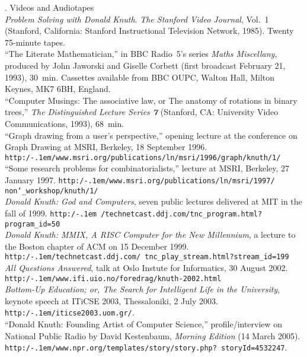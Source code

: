 \vskip 20pt
. {Videos and Audiotapes}
\\{\sl Problem Solving with Donald Knuth}. {\sl The Stanford Video Journal},
 Vol.~1 (Stanford, California: Stanford Instructional Television Network,
 1985). Twenty 75-minute tapes.
\\``The Literate Mathematician,'' in BBC Radio~5's series {\sl Maths
 Miscellany}, produced by John Jaworski and Giselle Corbett
 (first broadcast February 21, 1993), 30~min. Cassettes available from
 BBC OUPC, Walton Hall, Milton Keynes, MK7 6BH, England.
\\``Computer Musings: The associative law, or The anatomy of
 rotations in binary trees,'' {\sl The Distinguished Lecture Series\/ \bf7}
 (Stanford, CA: University Video Communications, 1993), 68~min.
\\``Graph drawing from a user's perspective,'' opening lecture at the
 conference on Graph Drawing at MSRI, Berkeley, 18 September 1996.
 {\tt http:/\kern-.1em/www.msri.org/publications/ln/msri/1996/graph/knuth/1/}
\\``Some research problems for combinatorialists,'' lecture
 at MSRI, Berkeley, 27 January 1997.
 {\tt http:/\kern-.1em/www.\allowbreak msri.org/publications/ln/msri/1997/%
 non\char`\_workshop/knuth/1/}
\\{\sl Donald Knuth: God and Computers}, seven public lectures delivered at MIT
 in the fall of 1999. {\tt http:/\kern-.1em
 /\allowbreak technetcast.ddj.com/tnc\_program.html?program\_id=50}
\\{\sl Donald Knuth: MMIX, A RISC Computer for the New Millennium}, a
 lecture to the Boston chapter of ACM on 15 December 1999.
 {\tt http:/\kern-.1em/technetcast.ddj.com/\allowbreak
 tnc\_play\_stream.html?stream\_id=199}
\\{\sl All Questions Answered}, talk at Oslo Instute for Informatics,
 30 August 2002.
 {\tt http:/\kern-.1em/www.ifi.uio.no/\allowbreak foredrag/knuth-2002.html}
\\{\sl Bottom-Up Education; or, The Search for Intelligent Life
 in the University}, keynote speech at ITiCSE 2003, Thessaloniki, 2 July 2003.
 {\tt http:/\kern-.1em/iticse2003.uom.gr/}.
\\``Donald Knuth: Founding Artist of Computer Science,'' profile/interview
 on National Public Radio by David Kestenbaum,
 {\sl Morning Edition\/} (14 March 2005).
 {\tt http:/\kern-.1em/www.npr.org/templates/story/story.php?\allowbreak
 storyId=4532247}.

\finishpage


